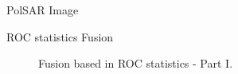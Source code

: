 \documentclass[10pt]{beamer}
\begin{document}
\begin{frame}[fragile]{PolSAR Image}
\begin{alertblock}{ROC statistics Fusion}
\begin{itemize}
\begin{figure}[htb!]
	\caption{Fusion based in ROC statistics - Part I.}
\label{cap_fusao_fig01}
\end{figure}
\end{itemize}
\end{alertblock}
\end{frame}
\end{document}
